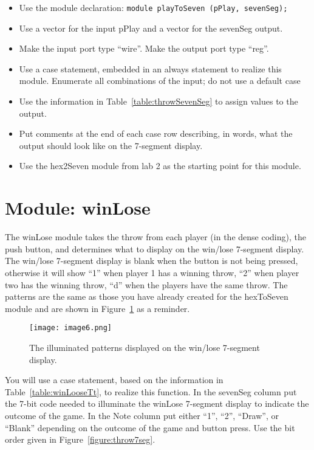 \begin{itemize}
\item
  Use the module declaration: \verb+module playToSeven (pPlay, sevenSeg);+
\item
  Use a vector for the input pPlay and a vector for the sevenSeg output.
\item
  Make the input port type ``wire''. Make the output port type ``reg''.
\item
  Use a case statement, embedded in an always statement to realize this
  module. Enumerate all combinations of the input; do not use a default
  case
\item
  Use the information in Table~\ref{table:throwSevenSeg} to assign values to the output.
\item
  Put comments at the end of each case row describing, in words, what
  the output should look like on the 7-segment display.
\item
  Use the hex2Seven module from lab 2 as the starting point for this
  module.
\end{itemize}


\section{Module: winLose}

The winLose module takes the throw from each player (in the dense
coding), the push button, and determines what to display on the win/lose
7-segment display. The win/lose 7-segment display is blank when the
button is not being pressed, otherwise it will show ``1'' when player 1
has a winning throw, ``2'' when player two has the winning throw, ``d''
when the players have the same throw. The patterns are the same as those
you have already created for the hexToSeven module and are shown in
Figure~\ref{fig:winLose7seg} as a reminder.

\begin{figure}[ht]
\texttt{[image:  image6.png]}
\caption{The illuminated patterns displayed on the win/lose 7-segment display.}
\label{fig:winLose7seg}
\end{figure}

You will use a case statement, based on the information in Table~\ref{table:winLooseTt}, to
realize this function. In the sevenSeg column put the 7-bit code needed
to illuminate the winLose 7-segment display to indicate the outcome of
the game. In the Note column put either ``1'', ``2'', ``Draw'', or
``Blank'' depending on the outcome of the game and button press. Use the
bit order given in Figure~\ref{figure:throw7seg}.

